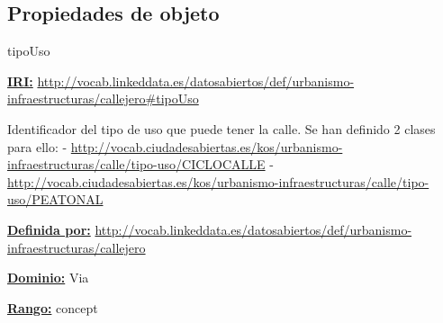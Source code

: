 \subsection{Propiedades de objeto}




\begin{mybox}{tipoUso}
\begin{flushleft}
\underline{\textbf{IRI:}}
\url{http://vocab.linkeddata.es/datosabiertos/def/urbanismo-infraestructuras/callejero#tipoUso}
\newline

Identificador del tipo de uso que puede tener la calle. Se han definido 2 clases para ello:
\newline -	\url{http://vocab.ciudadesabiertas.es/kos/urbanismo-infraestructuras/calle/tipo-uso/CICLOCALLE}
\newline -	 \url{http://vocab.ciudadesabiertas.es/kos/urbanismo-infraestructuras/calle/tipo-uso/PEATONAL}
\newline


\underline{\textbf{Definida por:}}
\url{http://vocab.linkeddata.es/datosabiertos/def/urbanismo-infraestructuras/callejero}
\newline

\underline{\textbf{Dominio:}} Via
\newline

\underline{\textbf{Rango:}}
	concept
\newline


\end{flushleft}
\end{mybox}





